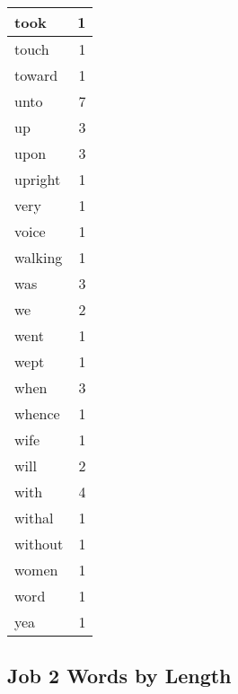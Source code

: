 \begin{center}
\begin{longtable}{l|r}
took & 1\\ \hline 
touch & 1\\ \hline 
toward & 1\\ \hline 
unto & 7\\ \hline 
up & 3\\ \hline 
upon & 3\\ \hline 
upright & 1\\ \hline 
very & 1\\ \hline 
voice & 1\\ \hline 
walking & 1\\ \hline 
was & 3\\ \hline 
we & 2\\ \hline 
went & 1\\ \hline 
wept & 1\\ \hline 
when & 3\\ \hline 
whence & 1\\ \hline 
wife & 1\\ \hline 
will & 2\\ \hline 
with & 4\\ \hline 
withal & 1\\ \hline 
without & 1\\ \hline 
women & 1\\ \hline 
word & 1\\ \hline 
yea & 1\\ \hline 
\end{longtable}
\end{center}





\subsection{Job 2 Words by Length}


\normalsize
 
